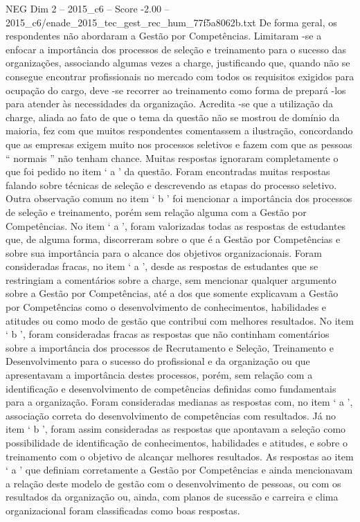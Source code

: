 \begin{textsample}{NEG Dim 2 – 2015\_c6 – Score -2.00 – 2015\_c6/enade\_2015\_tec\_gest\_rec\_hum\_77f5a8062b.txt}
De forma geral, os respondentes não abordaram a Gestão por Competências.
Limitaram -se a enfocar a importância dos processos de seleção e treinamento para o sucesso das organizações, associando algumas vezes a charge, justificando que, quando não se consegue encontrar profissionais no mercado com todos os requisitos exigidos para ocupação do cargo, deve -se recorrer ao treinamento como forma de prepará -los para atender às necessidades da organização.
Acredita -se que a utilização da charge, aliada ao fato de que o tema da questão não se mostrou de domínio da maioria, fez com que muitos respondentes comentassem a ilustração, concordando que as empresas exigem muito nos processos seletivos e fazem com que as pessoas “ normais ” não tenham chance.
Muitas respostas ignoraram completamente o que foi pedido no item ‘ a ’ da questão.
Foram encontradas muitas respostas falando sobre técnicas de seleção e descrevendo as etapas do processo seletivo.
Outra observação comum no item ‘ b ’ foi mencionar a importância dos processos de seleção e treinamento, porém sem relação alguma com a Gestão por Competências.
No item ‘ a ’, foram valorizadas todas as respostas de estudantes que, de alguma forma, discorreram sobre o que é a Gestão por Competências e sobre sua importância para o alcance dos objetivos organizacionais.
Foram consideradas fracas, no item ‘ a ’, desde as respostas de estudantes que se restringiam a comentários sobre a charge, sem mencionar qualquer argumento sobre a Gestão por Competências, até a dos que somente explicavam a Gestão por Competências como o desenvolvimento de conhecimentos, habilidades e atitudes ou como modo de gestão que contribui com melhores resultados.
No item ‘ b ’, foram consideradas fracas as respostas que não continham comentários sobre a importância dos processos de Recrutamento e Seleção, Treinamento e Desenvolvimento para o sucesso do profissional e da organização ou que apresentavam a importância destes processos, porém, sem relação com a identificação e desenvolvimento de competências definidas como fundamentais para a organização.
Foram consideradas medianas as respostas com, no item ‘ a ’, associação correta do desenvolvimento de competências com resultados.
Já no item ‘ b ’, foram assim consideradas as respostas que apontavam a seleção como possibilidade de identificação de conhecimentos, habilidades e atitudes, e sobre o treinamento com o objetivo de alcançar melhores resultados.
As respostas ao item ‘ a ’ que definiam corretamente a Gestão por Competências e ainda mencionavam a relação deste modelo de gestão com o desenvolvimento de pessoas, ou com os resultados da organização ou, ainda, com planos de sucessão e carreira e clima organizacional foram classificadas como boas respostas.

\end{textsample}
